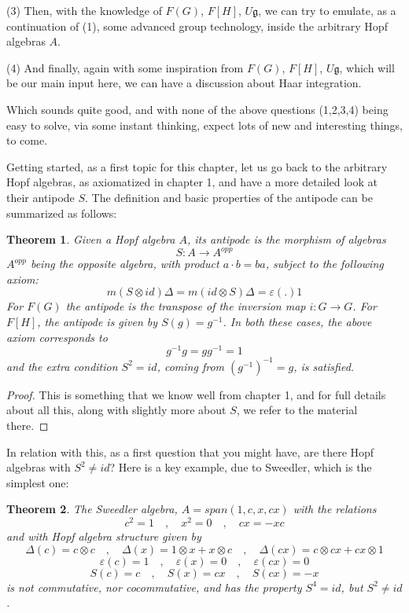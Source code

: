 \documentclass[12pt]{amsbook}
\newtheorem{theorem}{Theorem}[chapter]
\begin{document}
\bigskip

(3) Then, with the knowledge of $F(G)$, $F[H]$, $U\mathfrak g$, we can try to emulate, as a continuation of (1), some advanced group technology, inside the arbitrary Hopf algebras $A$.

\bigskip

(4) And finally, again with some inspiration from $F(G)$, $F[H]$, $U\mathfrak g$, which will be our main input here, we can have a discussion about Haar integration.

\bigskip

Which sounds quite good, and with none of the above questions (1,2,3,4) being easy to solve, via some instant thinking, expect lots of new and interesting things, to come.

\bigskip

Getting started, as a first topic for this chapter, let us go back to the arbitrary Hopf algebras, as axiomatized in chapter 1, and have a more detailed look at their antipode $S$. The definition and basic properties of the antipode can be summarized as follows:


\begin{theorem}
Given a Hopf algebra $A$, its antipode is the morphism of algebras
$$S:A\to A^{opp}$$
$A^{opp}$ being the opposite algebra, with product $a\cdot b=ba$, subject to the following axiom:
$$m(S\otimes id)\Delta=m(id\otimes S)\Delta=\varepsilon(.)1$$
For $F(G)$ the antipode is the transpose of the inversion map $i:G\to G$. For $F[H]$, the antipode is given by $S(g)=g^{-1}$. In both these cases, the above axiom corresponds to
$$g^{-1}g=gg^{-1}=1$$
and the extra condition $S^2=id$, coming from $(g^{-1})^{-1}=g$, is satisfied.
\end{theorem}

\begin{proof}
This is something that we know well from chapter 1, and for full details about all this, along with slightly more about $S$, we refer to the material there.
\end{proof}

In relation with this, as a first question that you might have, are there Hopf algebras with $S^2\neq id$? Here is a key example, due to Sweedler, which is the simplest one:


\begin{theorem}
The Sweedler algebra, $A=span(1,c,x,cx)$ with the relations
$$c^2=1\quad,\quad x^2=0\quad,\quad cx=-xc$$
and with Hopf algebra structure given by
$$\Delta(c)=c\otimes c\quad,\quad\Delta(x)=1\otimes x+x\otimes c\quad,\quad\Delta(cx)=c\otimes cx+cx\otimes1$$
$$\varepsilon(c)=1\quad,\quad\varepsilon(x)=0\quad,\quad\varepsilon(cx)=0$$
$$S(c)=c\quad,\quad S(x)=cx\quad,\quad S(cx)=-x$$
is not commutative, nor cocommutative, and has the property $S^4=id$, but $S^2\neq id$.
\end{theorem}
\end{document}

